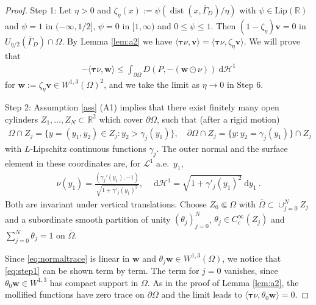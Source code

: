 \documentclass{article}
\theoremstyle{definition}
\newcommand{\bfv}{\boldsymbol{v}}
\newcommand{\bfw}{\boldsymbol{w}}
\newcommand{\bftau}{\boldsymbol{\tau}}
\newcommand{\dd}{\:\mathrm{d}}
\DeclareMathOperator{\dist}{dist}
\begin{document}
\begin{proof}
    Step 1:
    Let $\eta>0$ and $\zeta_\eta(x) := \psi (\dist(x,\bar\Gamma_D)/\eta)$ with $\psi \in \mathrm{Lip}(\mathbb R)$
    and $\psi = 1$ in $(-\infty,1/2]$, $\psi=0$ in $[1,\infty)$ and $0\leq \psi \leq 1$.
    Then $(1-\zeta_\eta)\bfv =0$ in $U_{\eta/2}(\bar\Gamma_D)\cap \Omega$. By Lemma \ref{lem:a2} we have
    $\langle \bftau \nu, \bfv\rangle = \langle \bftau\nu,\zeta_\eta \bfv\rangle$. We will prove that
    \begin{align}
        -\langle\bftau\nu,\bfw\rangle \leq \int_{\partial\Omega} D(P,-(\bfw\odot \nu)) \dd \mathcal{H}^1 \label{eq:step1}
    \end{align}
    for $\bfw:=\zeta_\eta\bfv \in W^{1,3}(\Omega)^2$, and we take the limit as $\eta\rightarrow0$
    in Step 6.

    Step 2:
    Assumption \ref{ass} (A1) implies that there exist finitely many open cylinders $Z_1,\dots,Z_N \subset \mathbb R^2$
    which cover $\partial\Omega$, such that (after a rigid motion)
    \begin{align*}
        \Omega\cap Z_j = \{y=(y_1,y_2)\in Z_j : y_2>\gamma_j(y_1)\}, \quad \partial\Omega\cap Z_j
        =\{y:y_2=\gamma_j(y_1)\}\cap Z_j
    \end{align*}
    with $L$-Lipschitz continuous functions $\gamma_j$. The outer normal and the surface element
    in these coordinates are, for $\mathcal{L}^1$ a.e.\ $y_1$,
    \begin{align*}
        \nu(y_1) = \frac{(\gamma_j'(y_1),-1)}{\sqrt{1+\gamma'_j(y_1)^2}}, \quad \dd \mathcal{H}^1 = \sqrt{1+\gamma'_j(y_1)^2} \dd y_1 \ .
    \end{align*}
    Both are invariant under vertical translations. Choose $Z_0\Subset \Omega$ with
    $\bar\Omega \subset \cup_{j=0}^N Z_j$ and a subordinate smooth partition of unity $(\theta_j)_{j=0}^N$,
    $\theta_j\in C^\infty_c(Z_j)$ and $\sum_{j=0}^{N}\theta_j =1$ on $\bar\Omega$.

    Since \eqref{eq:normaltrace} is linear in $\bfw$ and
    $\theta_j\bfw \in W^{1,3}(\Omega)$, we notice that \eqref{eq:step1} can be shown term by term.
    The term for $j=0$ vanishes, since $\theta_0\bfw\in W^{1,3}$ has compact support
    in $\Omega$. As in the proof of Lemma \ref{lem:a2}, the mollified functions have zero trace on $\partial\Omega$ and the limit leads to
    $\langle \bftau\nu, \theta_0\bfw\rangle =0$.


\end{proof}
\end{document}
